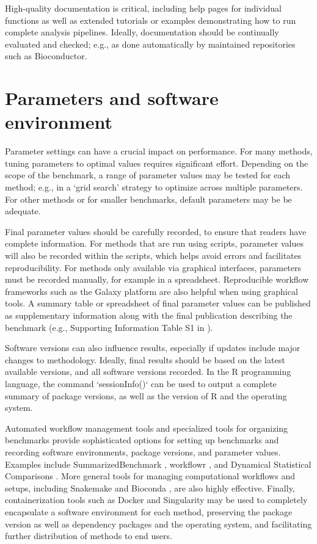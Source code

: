 \documentclass[12pt, a4paper]{article}
\begin{document}
High-quality documentation is critical, including help pages for individual functions as well as extended tutorials or examples demonstrating how to run complete analysis pipelines. Ideally, documentation should be continually evaluated and checked; e.g., as done automatically by maintained repositories such as Bioconductor.




\section*{Parameters and software environment}

Parameter settings can have a crucial impact on performance. For many methods, tuning parameters to optimal values requires significant effort. Depending on the scope of the benchmark, a range of parameter values may be tested for each method; e.g., in a `grid search' strategy to optimize across multiple parameters. For other methods or for smaller benchmarks, default parameters may be be adequate.

Final parameter values should be carefully recorded, to ensure that readers have complete information. For methods that are run using scripts, parameter values will also be recorded within the scripts, which helps avoid errors and facilitates reproducibility. For methods only available via graphical interfaces, parameters must be recorded manually, for example in a spreadsheet. Reproducible workflow frameworks such as the Galaxy platform \citep{Afgan2018} are also helpful when using graphical tools. A summary table or spreadsheet of final parameter values can be published as supplementary information along with the final publication describing the benchmark (e.g., Supporting Information Table S1 in \citep{Weber2016}).

Software versions can also influence results, especially if updates include major changes to methodology. Ideally, final results should be based on the latest available versions, and all software versions recorded. In the R programming language, the command `sessionInfo()` can be used to output a complete summary of package versions, as well as the version of R and the operating system.

Automated workflow management tools and specialized tools for organizing benchmarks provide sophisticated options for setting up benchmarks and recording software environments, package versions, and parameter values. Examples include SummarizedBenchmark \citep{Kimes2018}, workflowr \citep{Blischak2018}, and Dynamical Statistical Comparisons \citep{Wang2018}. More general tools for managing computational workflows and setups, including Snakemake \citep{Koster2012} and Bioconda \citep{Gruning2018}, are also highly effective. Finally, containerization tools such as Docker and Singularity may be used to completely encapsulate a software environment for each method, preserving the package version as well as dependency packages and the operating system, and facilitating further distribution of methods to end users.
\end{document}
